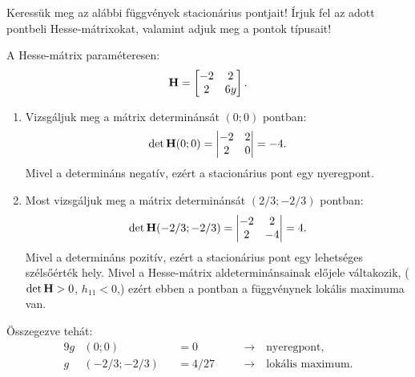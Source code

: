 \begin{exercise}{%
    Keressük meg az alábbi függvények stacionárius pontjait! Írjuk fel az adott
    pontbeli Hesse-mátrixokat, valamint adjuk meg a pontok típusait!
  }
{\begin{enumerate}[a)]
            A Hesse-mátrix paraméteresen:
            \[
              \mathbf{H} = \begin{bmatrix}
                -2 & 2 \\ 2 & 6y
              \end{bmatrix}
              \text.
            \]

            \begin{enumerate}[1)]
              \item Vizsgáljuk meg a mátrix determinánsát $(0; 0)$ pontban:
                    \[
                      \det \mathbf{H}(0;0) = \begin{vmatrix}
                        -2 & 2 \\ 2 & 0
                      \end{vmatrix} = -4 \text.
                    \]
                    Mivel a determináns negatív, ezért a stacionárius pont
                    egy nyeregpont.

              \item Most vizsgáljuk meg a mátrix determinánsát $(2/3; -2/3)$
                    pontban:
                    \[
                      \det \mathbf{H}(-2/3;-2/3) = \begin{vmatrix}
                        -2 & 2 \\ 2 & -4
                      \end{vmatrix} = 4 \text.
                    \]
                    Mivel a determináns pozitív, ezért a stacionárius pont
                    egy lehetséges szélsőérték hely. Mivel a Hesse-mátrix
                    aldeterminánsainak előjele váltakozik, ($\det \mathbf{H} > 0$,
                    $h_{11} < 0$,) ezért ebben a pontban a függvénynek
                    lokális maximuma van.
            \end{enumerate}

            Összegezve tehát:
            \begin{alignat*}{9}
              g & (0  ; 0  )   &  & = 0 \quad    &  & \rightarrow \quad
              \text{nyeregpont,}
              \\
              g & (-2/3; -2/3) &  & = 4/27 \quad &  & \rightarrow \quad
              \text{lokális maximum.}
            \end{alignat*}

    \end{enumerate}
  }
\end{exercise}
